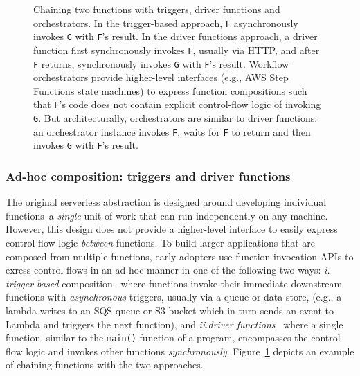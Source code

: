 \begin{figure}[t!]
    \centering
    \caption{Chaining two functions with triggers, driver functions and
    orchestrators. In the trigger-based approach, \texttt{F} asynchronously
    invokes \texttt{G} with \texttt{F}'s result. In the driver functions
    approach, a driver function first synchronously invokes \texttt{F},
    usually via HTTP, and after \texttt{F} returns, synchronously invokes
    \texttt{G} with \texttt{F}'s result. Workflow orchestrators provide
    higher-level interfaces (e.g., AWS Step Functions state machines) to
    express function compositions such that \texttt{F}'s code does not contain
    explicit control-flow logic of invoking \texttt{G}. But architecturally,
    orchestrators are similar to driver functions: an orchestrator instance
    invokes \texttt{F}, waits for \texttt{F} to return and then invokes
    \texttt{G} with \texttt{F}'s result.}
    \label{fig:chain-example}
\end{figure}

\subsubsection{Ad-hoc composition: triggers and driver functions}

The original serverless abstraction is designed around developing individual
functions--a \textit{single} unit of work that can run independently on any
machine. However, this design does not provide a higher-level interface to
easily express control-flow logic \emph{between} functions. To build larger
applications that are composed from multiple functions, early adopters use
function invocation APIs to exress control-flows in an ad-hoc manner in one of
the following two ways: \textit{ i. trigger-based}
composition~\cite{netherite} where functions invoke their immediate downstream
functions with \emph{asynchronous} triggers, usually via a queue or data
store, (e.g., a lambda writes to an SQS queue or S3 bucket which in turn sends
an event to Lambda and triggers the next function), and \textit{ii.driver
functions}~\cite{beldi} where a single function, similar to the
\texttt{main()} function of a program, encompasses the control-flow logic and
invokes other functions \emph{synchronously}. Figure~\ref{fig:chain-example}
depicts an example of chaining functions with the two approaches.
	
